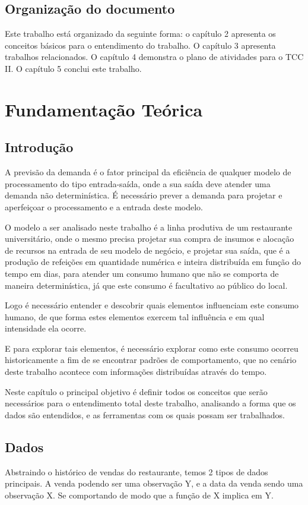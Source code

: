 \documentclass[	12pt, Times, openright, twoside, a4paper, english, brazil]{abntex2}
\begin{document}
\section{Organização do documento}
Este trabalho está organizado da seguinte forma: o capítulo 2 apresenta os conceitos básicos para o entendimento do trabalho. O capítulo 3 apresenta trabalhos relacionados. O capítulo 4 demonstra o plano de atividades para o TCC II. O capítulo 5 conclui este trabalho.
\chapter{Fundamentação Teórica}
\section{Introdução}
A previsão da demanda é o fator principal da eficiência de qualquer modelo de processamento do tipo entrada-saída, onde a sua saída deve atender uma demanda não determinística. É necessário prever a demanda para projetar e aperfeiçoar o processamento e a entrada deste modelo. 

O modelo a ser analisado neste trabalho é a linha produtiva de um restaurante universitário, onde o mesmo precisa projetar sua compra de insumos e alocação de recursos na entrada de seu modelo de negócio, e projetar sua saída, que é a produção de refeições em quantidade numérica e inteira distribuída em função do tempo em dias, para atender um consumo humano que não se comporta de maneira determinística, já que este consumo é facultativo ao público do local.

Logo é necessário entender e descobrir quais elementos influenciam este consumo humano, de que forma estes elementos exercem tal influência e em qual intensidade ela ocorre.

E para explorar tais elementos, é necessário explorar como este consumo ocorreu historicamente a fim de se encontrar padrões de comportamento, que no cenário deste trabalho acontece com informações distribuídas através do tempo. 

Neste capítulo o principal objetivo é definir todos os conceitos que serão necessários para o entendimento total deste trabalho, analisando a forma que os dados são entendidos, e as ferramentas com os quais possam ser trabalhados.

\section{Dados}
Abstraindo o histórico de vendas do restaurante, temos 2 tipos de dados principais. A venda podendo ser uma observação Y, e a data da venda sendo uma observação X. Se comportando de modo que a função de X implica em Y. 
\end{document}
